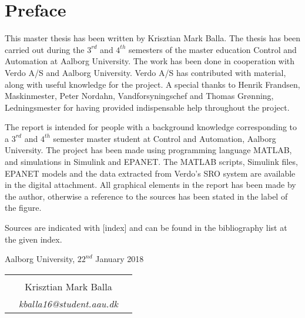\chapter*{Preface}

This master thesis has been written by Krisztian Mark Balla. The thesis has been carried out during the $3^{rd}$ and $4^{th}$ semesters of the master education Control and Automation at Aalborg University. The work has been done in cooperation with Verdo A/S and Aalborg University. Verdo A/S has contributed with material, along with useful knowledge for the project. A special thanks to Henrik Frandsen, Maskinmester, Peter Nordahn, Vandforsyningschef and Thomas Grønning, Ledningsmester for having provided indispensable help throughout the project. 

The report is intended for people with a background knowledge corresponding to a $3^{rd}$ and $4^{th}$ semester master student at Control and Automation, Aalborg University. The project has been made using programming language MATLAB, and simulations in Simulink and EPANET. The MATLAB scripts, Simulink files, EPANET models and the data extracted from Verdo's SRO system are available in the digital attachment. All graphical elements in the report has been made by the author, otherwise a reference to the sources has been stated in the label of the figure. 

Sources are indicated with [index] and can be found in the bibliography list at the given index. 

\hfill Aalborg University, $22^{nd}$ January 2018




\vfill

\begin{table}[H]
	\centering
		\begin{tabular}{c c c}
			& \underline{\phantom{mmmmmmmmmmmmmmmmmmm}} 	& \\
			& Krisztian Mark Balla					& \\
			& \textit{kballa16@student.aau.dk}		& \\
		\end{tabular}
\end{table}